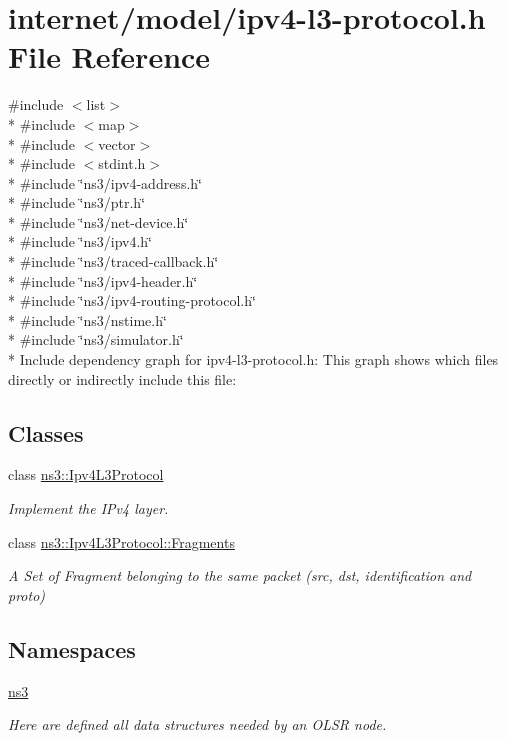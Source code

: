 \hypertarget{ipv4-l3-protocol_8h}{}\section{internet/model/ipv4-\/l3-\/protocol.h File Reference}
\label{ipv4-l3-protocol_8h}
{\ttfamily \#include $<$list$>$}\\*
{\ttfamily \#include $<$map$>$}\\*
{\ttfamily \#include $<$vector$>$}\\*
{\ttfamily \#include $<$stdint.\+h$>$}\\*
{\ttfamily \#include \char`\"{}ns3/ipv4-\/address.\+h\char`\"{}}\\*
{\ttfamily \#include \char`\"{}ns3/ptr.\+h\char`\"{}}\\*
{\ttfamily \#include \char`\"{}ns3/net-\/device.\+h\char`\"{}}\\*
{\ttfamily \#include \char`\"{}ns3/ipv4.\+h\char`\"{}}\\*
{\ttfamily \#include \char`\"{}ns3/traced-\/callback.\+h\char`\"{}}\\*
{\ttfamily \#include \char`\"{}ns3/ipv4-\/header.\+h\char`\"{}}\\*
{\ttfamily \#include \char`\"{}ns3/ipv4-\/routing-\/protocol.\+h\char`\"{}}\\*
{\ttfamily \#include \char`\"{}ns3/nstime.\+h\char`\"{}}\\*
{\ttfamily \#include \char`\"{}ns3/simulator.\+h\char`\"{}}\\*
Include dependency graph for ipv4-\/l3-\/protocol.h\+:
This graph shows which files directly or indirectly include this file\+:
\subsection*{Classes}
\begin{DoxyCompactItemize}
\item 
class \hyperlink{classns3_1_1Ipv4L3Protocol}{ns3\+::\+Ipv4\+L3\+Protocol}
\begin{DoxyCompactList}\small\item\em Implement the I\+Pv4 layer. \end{DoxyCompactList}\item 
class \hyperlink{classns3_1_1Ipv4L3Protocol_1_1Fragments}{ns3\+::\+Ipv4\+L3\+Protocol\+::\+Fragments}
\begin{DoxyCompactList}\small\item\em A Set of Fragment belonging to the same packet (src, dst, identification and proto) \end{DoxyCompactList}\end{DoxyCompactItemize}
\subsection*{Namespaces}
\begin{DoxyCompactItemize}
\item 
 \hyperlink{namespacens3}{ns3}
\begin{DoxyCompactList}\small\item\em Here are defined all data structures needed by an O\+L\+SR node. \end{DoxyCompactList}\end{DoxyCompactItemize}
